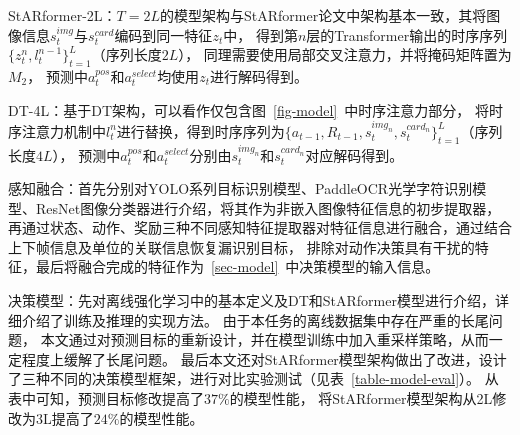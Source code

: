 StARformer-2L：$T=2L$的模型架构与StARformer论文中架构基本一致，其将图像信息$s_{t}^{img}$与$s_{t}^{card}$编码到同一特征$z_t$中，
得到第$n$层的Transformer输出的时序序列$\{z_t^{n}, l_{t}^{n-1}\}_{t=1}^{L}$（序列长度$2L$），
同理需要使用局部交叉注意力，并将掩码矩阵置为$M_2$，
预测中$a_{t}^{pos}$和$a_{t}^{select}$均使用$z_t$进行解码得到。

DT-4L：基于DT架构，可以看作仅包含图~\ref{fig-model}~中时序注意力部分，
将时序注意力机制中$l_t^{n}$进行替换，得到时序序列为$\{a_{t-1},R_{t-1},s_{t}^{img_n}, s_{t}^{card_n}\}_{t=1}^{L}$（序列长度$4L$），
预测中$a_{t}^{pos}$和$a_{t}^{select}$分别由$s_{t}^{img_n}$和$s_{t}^{card_n}$对应解码得到。

% 
感知融合：首先分别对YOLO系列目标识别模型、PaddleOCR光学字符识别模型、ResNet图像分类器进行介绍，将其作为非嵌入图像特征信息的初步提取器，
再通过状态、动作、奖励三种不同感知特征提取器对特征信息进行融合，通过结合上下帧信息及单位的关联信息恢复漏识别目标，
排除对动作决策具有干扰的特征，最后将融合完成的特征作为~\ref{sec-model}~中决策模型的输入信息。

决策模型：先对离线强化学习中的基本定义及DT和StARformer模型进行介绍，详细介绍了训练及推理的实现方法。
由于本任务的离线数据集中存在严重的长尾问题，
本文通过对预测目标的重新设计，并在模型训练中加入重采样策略，从而一定程度上缓解了长尾问题。
最后本文还对StARformer模型架构做出了改进，设计了三种不同的决策模型框架，进行对比实验测试（见表~\ref{table-model-eval}）。
从表中可知，预测目标修改提高了$37\%$的模型性能，
将StARformer模型架构从2L修改为3L提高了$24\%$的模型性能。
